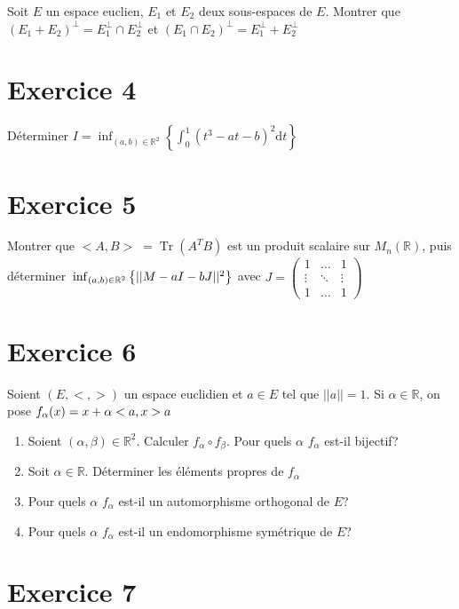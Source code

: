 \documentclass[11pt]{article}
\begin{document}
Soit $E$ un espace euclien, $E_1$ et $E_2$ deux sous-espaces de $E$. Montrer que $ (E_1 + E_2)^{\perp}= E_1^{\perp}\cap E_2^{\perp}$ et $(E_1\cap E_2)^{\perp} = E_1^{\perp} + E_2^{\perp}$

\section*{Exercice 4}

Déterminer $I = \inf_{ (a,b)\in\mathbb{R}^2}\left\{ \int_0^1 (t^3 -at-b)^2 \mathrm{d}t \right\}$

\section*{Exercice 5}

Montrer que $<A,B> \; = \operatorname{Tr}(A^{T}B)$ est un produit scalaire sur $\textit{M}_n(\mathbb{R})$, puis déterminer $\\\inf_{(a,b)\in\mathbb{R}^2} \left\{||M-aI-bJ||^2\right\}$ avec $J = \begin{pmatrix}
1 & \dots & 1\\
\vdots & \ddots & \vdots\\
1 & \dots & 1 
\end{pmatrix}$

\section*{Exercice 6}

Soient $(E,<,>)$ un espace euclidien et $a\in E$ tel que $||a||=1$. Si $\alpha\in\mathbb{R}$, on pose $\\ f_{\alpha}(x) = x + \alpha<a,x>a$

\begin{enumerate}

\item Soient $(\alpha,\beta)\in\mathbb{R}^2$. Calculer $f_\alpha\circ f_\beta$. Pour quels $\alpha$ $f_\alpha$ est-il bijectif?
\item Soit $\alpha\in\mathbb{R}$. Déterminer les éléments propres de $f_{\alpha}$
\item Pour quels $\alpha$ $f_\alpha$ est-il un automorphisme orthogonal de $E$?
\item Pour quels $\alpha$ $f_\alpha$ est-il un endomorphisme symétrique de $E$?
\end{enumerate}

\section*{Exercice 7}
\end{document}
